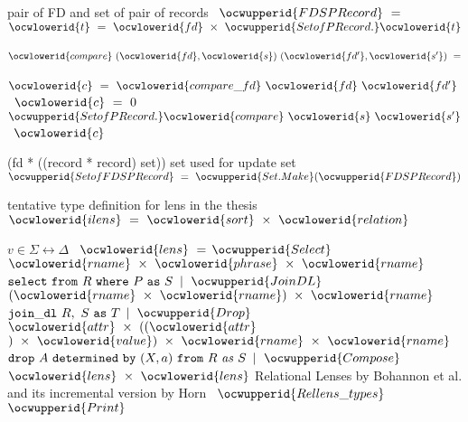 \documentclass[12pt]{article}
\begin{document}
\ocwendcode{}\ocwindent{0.00em}
pair of FD and set of pair of records 
\ocweol
\label{rellens_types.ml:4545}%
\medskip
\ocwbegincode{}\ocwindent{0.00em}
~$\ocwupperid{FDSPRecord}~=~$\ocweol
\ocwindent{1.00em}
~$\ocwlowerid{t}~=~\ocwlowerid{fd}~\times{}~\ocwupperid{SetofPRecord.}\ocwlowerid{t}$\ocweol
\ocwindent{1.00em}
~$\ocwlowerid{compare}~(\ocwlowerid{fd},\ocwlowerid{s})~(\ocwlowerid{fd'},\ocwlowerid{s'})~=$\ocweol
\ocwindent{2.00em}
~$\ocwlowerid{c}~=~\ocwlowerid{compare\_fd}~\ocwlowerid{fd}~\ocwlowerid{fd'}~$\ocweol
\ocwindent{2.00em}
~$\ocwlowerid{c}~=~0$\ocweol
\ocwindent{2.00em}
~$\ocwupperid{SetofPRecord.}\ocwlowerid{compare}~\ocwlowerid{s}~\ocwlowerid{s'}$\ocweol
\ocwindent{2.00em}
~$\ocwlowerid{c}$\ocweol
\ocwindent{0.00em}
\medskip

\ocwendcode{}\ocwindent{0.00em}
(fd * ((record * record) set)) set  used for update set 
\ocweol
\label{rellens_types.ml:4798}%
\medskip
\ocwbegincode{}\ocwindent{0.00em}
~$\ocwupperid{SetofFDSPRecord}~=~\ocwupperid{Set.Make}(\ocwupperid{FDSPRecord})$\medskip

\ocwendcode{}\ocwindent{0.00em}
tentative type definition for lens in the thesis 
\ocweol
\label{rellens_types.ml:4900}%
\medskip
\ocwbegincode{}\ocwindent{0.00em}
~$\ocwlowerid{ilens}~=~\ocwlowerid{sort}~\times{}~\ocwlowerid{relation}$\medskip

\ocwendcode{}\ocwindent{0.00em}
$v \in \Sigma \leftrightarrow \Delta$ 
\ocweol
\label{rellens_types.ml:4995}%
\medskip
\ocwbegincode{}\ocwindent{0.00em}
~$\ocwlowerid{lens}~=$\ocweol
\ocwindent{2.00em}
$\ocwupperid{Select}~$~$\ocwlowerid{rname}~\times{}~\ocwlowerid{phrase}~\times{}~\ocwlowerid{rname}~$\ocwbc{} $\mt{select\ from}\ R\ \mt{where}\ P\ \mt{as}\ S$ \ocwec{}\ocweol
\ocwindent{1.00em}
$\mid{}~\ocwupperid{JoinDL}~$~$(\ocwlowerid{rname}~\times{}~\ocwlowerid{rname})~\times{}~\ocwlowerid{rname}~$\ocwbc{} $\mathtt{join\_dl}\ R,\ S\ \mathtt{as}\ T$ \ocwec{}\ocweol
\ocwindent{1.00em}
$\mid{}~\ocwupperid{Drop}~$~$\ocwlowerid{attr}~\times{}~((\ocwlowerid{attr}~$$)~\times{}~\ocwlowerid{value})~\times{}~\ocwlowerid{rname}~\times{}~\ocwlowerid{rname}~$\ocweol
\ocwindent{8.00em}
\ocwbc{} $\mt{drop}\ A\ \mt{determined\ by}\ (X,a)\ \mt{from}\ R\ \mi{as}\ S$ \ocwec{}\ocweol
\ocwindent{1.00em}
$\mid{}~\ocwupperid{Compose}~$~$\ocwlowerid{lens}~\times{}~\ocwlowerid{lens}$\ocweol
\ocwendcode{}
\label{rellens.ml:0}%
Relational Lenses by Bohannon et al. and its incremental version by Horn 
\ocweol
\label{rellens.ml:81}%
\medskip
\ocwbegincode{}\ocwindent{0.00em}
~$\ocwupperid{Rellens\_types}$\ocweol
\ocwindent{0.00em}
~$\ocwupperid{Print}$\medskip
\end{document}
